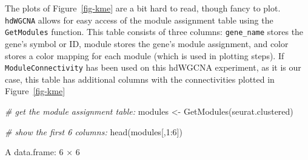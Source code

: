 \documentclass[
  letterpaper,
  DIV=11,
  numbers=noendperiod]{scrartcl}
\newenvironment{Shaded}{\begin{snugshade}}{\end{snugshade}}
\newcommand{\CommentTok}[1]{\textcolor[rgb]{0.38,0.63,0.69}{\textit{#1}}}
\newcommand{\DecValTok}[1]{\textcolor[rgb]{0.25,0.63,0.44}{#1}}
\newcommand{\FunctionTok}[1]{\textcolor[rgb]{0.02,0.16,0.49}{#1}}
\newcommand{\NormalTok}[1]{\textcolor[rgb]{0.00,0.44,0.13}{#1}}
\newcommand{\OtherTok}[1]{\textcolor[rgb]{0.00,0.44,0.13}{#1}}
\newcommand{\SpecialCharTok}[1]{\textcolor[rgb]{0.25,0.44,0.63}{#1}}
\begin{document}
The plots of Figure~\ref{fig-kme} are a bit hard to read, though fancy
to plot. \texttt{hdWGCNA} allows for easy access of the module
assignment table using the \texttt{GetModules} function. This table
consists of three columns: \texttt{gene\_name} stores the gene's symbol
or ID, module stores the gene's module assignment, and color stores a
color mapping for each module (which is used in plotting steps). If
\texttt{ModuleConnectivity} has been used on this hdWGCNA experiment, as
it is our case, this table has additional columns with the
connectivities plotted in Figure~\ref{fig-kme}

\begin{Shaded}
\begin{Highlighting}[]
\CommentTok{\# get the module assignment table:}
\NormalTok{modules }\OtherTok{\textless{}{-}} \FunctionTok{GetModules}\NormalTok{(seurat.clustered)}

\CommentTok{\# show the first 6 columns:}
\FunctionTok{head}\NormalTok{(modules[,}\DecValTok{1}\SpecialCharTok{:}\DecValTok{6}\NormalTok{])}
\end{Highlighting}
\end{Shaded}

A data.frame: 6 × 6
\end{document}
